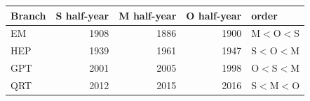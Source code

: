 \begin{tabular}{@{}lrrrl@{}}\toprule
Branch & S half-year & M half-year & O half-year & order \\\midrule
EM & 1908 & 1886 & 1900 & M$<$O$<$S \\
HEP & 1939 & 1961 & 1947 & S$<$O$<$M \\
GPT & 2001 & 2005 & 1998 & O$<$S$<$M \\
QRT & 2012 & 2015 & 2016 & S$<$M$<$O \\
\bottomrule\end{tabular}
